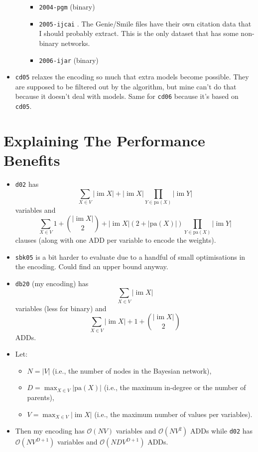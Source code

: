 \documentclass{article}
\theoremstyle{definition}
\theoremstyle{remark}
\DeclareMathOperator{\im}{im}
\begin{document}
\begin{itemize}
\begin{itemize}
    \begin{itemize}
    \item \texttt{2004-pgm} \cite{DBLP:journals/ijar/ChaviraDJ06} (binary)
    \item \texttt{2005-ijcai} \cite{DBLP:conf/ijcai/ChaviraD05}. The Genie/Smile
      files have their own citation data that I should probably extract. This is
      the only dataset that has some non-binary networks.
    \item \texttt{2006-ijar} \cite{DBLP:journals/ijar/ChaviraDJ06} (binary)
    \end{itemize}
  \end{itemize}
\item \texttt{cd05} relaxes the encoding so much that extra models become
  possible. They are supposed to be filtered out by the algorithm, but mine
  can't do that because it doesn't deal with models. Same for \texttt{cd06}
  because it's based on \texttt{cd05}.
\end{itemize}

\section{Explaining The Performance Benefits}

\begin{itemize}
\item \texttt{d02} has
  \[
    \sum_{X \in V} |\im X| + |\im X|\prod_{Y \in \mathrm{pa}(X)}|\im Y|
  \]
  variables and
  \[
    \sum_{X \in V} 1 + \binom{|\im X|}{2} + |\im X|(2 +
    |\mathrm{pa}(X)|)\prod_{Y \in \mathrm{pa}(X)} |\im Y|
  \]
  clauses (along with one ADD per variable to encode the weights).
\item \texttt{sbk05} is a bit harder to evaluate due to a handful of small
  optimisations in the encoding. Could find an upper bound anyway.
\item \texttt{db20} (my encoding) has
  \[
    \sum_{X \in V} |\im X|
  \]
  variables (less for binary) and
  \[
    \sum_{X \in V} |\im X| + 1 + \binom{|\im X|}{2}
  \]
  ADDs.
\item Let:
  \begin{itemize}
  \item $N = |V|$ (i.e., the number of nodes in the Bayesian network),
  \item $D = \max_{X \in V} |\mathrm{pa}(X)|$ (i.e., the maximum in-degree or
    the number of parents),
  \item $V = \max_{X \in V} |\im X|$ (i.e., the maximum number of values per
    variables).
  \end{itemize}
\item Then my encoding has $\mathcal{O}(NV)$ variables and $\mathcal{O}(NV^2)$
  ADDs while \texttt{d02} has $\mathcal{O}(NV^{D+1})$ variables and
  $\mathcal{O}(NDV^{D+1})$ ADDs.
\end{itemize}
\end{document}
